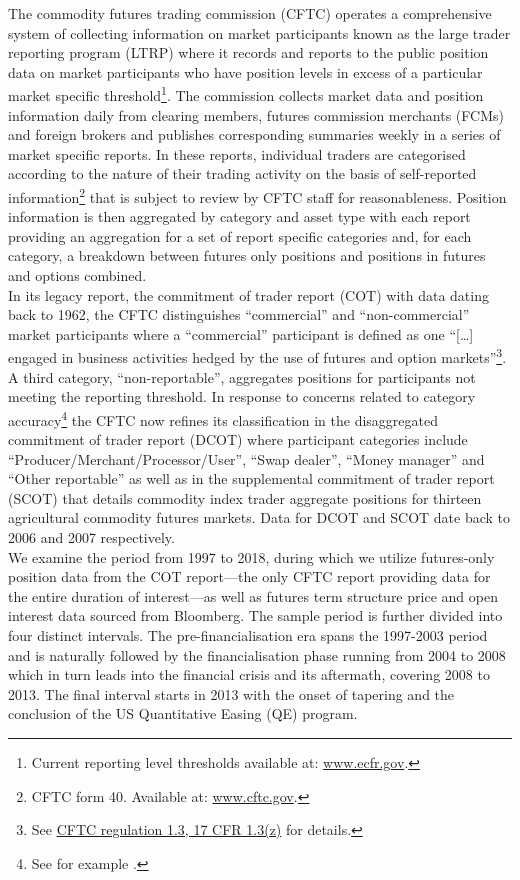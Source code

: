 \documentclass[
  authoryear,
  preprint,
  3p]{elsarticle}
\begin{document}
The commodity futures trading commission (CFTC) operates a comprehensive
system of collecting information on market participants known as the
large trader reporting program (LTRP) where it records and reports to
the public position data on market participants who have position levels
in excess of a particular market specific threshold\footnote{Current
  reporting level thresholds available at:
  \href{https://www.ecfr.gov/cgi-bin/retrieveECFR?gp=&SID=970471b8455f4bab7db4110cfde50731&mc=true&r=SECTION&n=se17.1.15_103}{www.ecfr.gov}.}.
The commission collects market data and position information daily from
clearing members, futures commission merchants (FCMs) and foreign
brokers and publishes corresponding summaries weekly in a series of
market specific reports. In these reports, individual traders are
categorised according to the nature of their trading activity on the
basis of self-reported information\footnote{CFTC form 40. Available at:
  \href{https://www.cftc.gov/sites/default/files/idc/groups/public/@forms/documents/file/cftcform40.pdf}{www.cftc.gov}.}
that is subject to review by CFTC staff for reasonableness. Position
information is then aggregated by category and asset type with each
report providing an aggregation for a set of report specific categories
and, for each category, a breakdown between futures only positions and
positions in futures and options combined.\\
In its legacy report, the commitment of trader report (COT) with data
dating back to 1962, the CFTC distinguishes ``commercial'' and
``non-commercial'' market participants where a ``commercial''
participant is defined as one ``{[}\ldots{]} engaged in business
activities hedged by the use of futures and option markets''\footnote{See
  \href{https://www.gpo.gov/fdsys/pkg/CFR-1998-title17-vol1/xml/CFR-1998-title17-vol1-sec1-3.xml}{CFTC
  regulation 1.3, 17 CFR 1.3(z)} for details.}. A third category,
``non-reportable'', aggregates positions for participants not meeting
the reporting threshold. In response to concerns related to category
accuracy\footnote{See for example \citet{ederington_who_2002}.} the CFTC
now refines its classification in the disaggregated commitment of trader
report (DCOT) where participant categories include
``Producer/Merchant/Processor/User'', ``Swap dealer'', ``Money manager''
and ``Other reportable'' as well as in the supplemental commitment of
trader report (SCOT) that details commodity index trader aggregate
positions for thirteen agricultural commodity futures markets. Data for
DCOT and SCOT date back to 2006 and 2007 respectively.\\
We examine the period from 1997 to 2018, during which we utilize
futures-only position data from the COT report---the only CFTC report
providing data for the entire duration of interest---as well as futures
term structure price and open interest data sourced from Bloomberg. The
sample period is further divided into four distinct intervals. The
pre-financialisation era spans the 1997-2003 period and is naturally
followed by the financialisation phase running from 2004 to 2008 which
in turn leads into the financial crisis and its aftermath, covering 2008
to 2013. The final interval starts in 2013 with the onset of tapering
and the conclusion of the US Quantitative Easing (QE) program.
\end{document}
